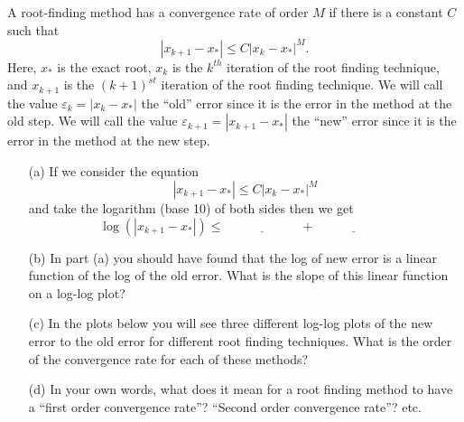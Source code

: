 \begin{problem}
    A root-finding method has a convergence rate of order $M$ if there is a constant $C$
    such that 
    \[ |x_{k+1} - x_*| \leq C |x_k - x_*|^M. \]
    Here, $x_*$ is the exact root, $x_k$ is
    the $k^{th}$ iteration of the root finding technique, and $x_{k+1}$ is the
    $(k+1)^{st}$ iteration of the root finding technique.  We will call the value
    $\varepsilon_k = |x_{k}-x_*|$ the ``old'' error since it is the error in the method at the old step.
    We will call the value $\varepsilon_{k+1} = |x_{k+1}-x_*|$ the ``new'' error since it is the error in the
    method at the new step.
    \begin{enumerate}
        \item[(a)] If we consider the equation 
            \[ |x_{k+1} - x_*| \leq C |x_k - x_*|^M \]
            and take the logarithm (base 10) of both sides then we get
            \[ \log\left( |x_{k+1} - x_*| \right) \leq \underline{\hspace{1in}} +
            \underline{\hspace{1in}} \]
        \item[(b)] In part (a) you should have found that the log of new error is a linear
            function of the log of the old error.  What is the slope of this linear
            function on a log-log plot?
        \item[(c)] In the plots below you will see three different log-log plots of the new
            error to the old error for different root finding techniques.  What is the
            order of the convergence rate for each of these methods?
        \item[(d)] In your own words, what does it mean for a root finding method to have
            a ``first order convergence rate''?  ``Second order convergence rate''? etc.
    \end{enumerate}
\begin{center}
\end{center}
\end{problem}
